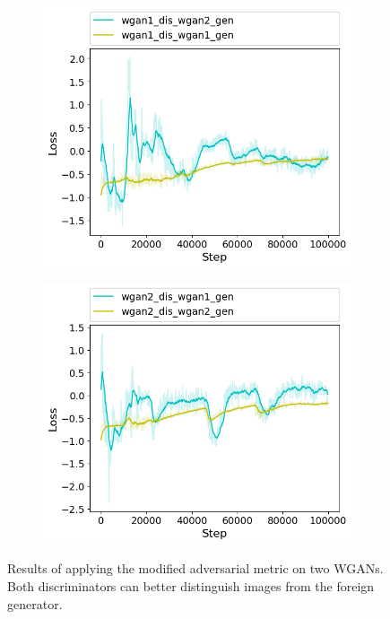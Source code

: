 \begin{figure}[h!]
	\begin{subfigure}[b]{0.5\textwidth}
		\includegraphics[width=\textwidth]{figures/cross_dis/trial17_wgan1_dis_wgan2_gen}
	\end{subfigure}
	\begin{subfigure}[b]{0.5\textwidth}
		\includegraphics[width=\textwidth]{figures/cross_dis/trial17_wgan2_dis_wgan1_gen}
	\end{subfigure}
	\caption{Results of applying the modified adversarial metric on two WGANs. Both discriminators can better distinguish images from the foreign generator.}
	\label{fig:cd_wgan_vs_wgan}
\end{figure}

